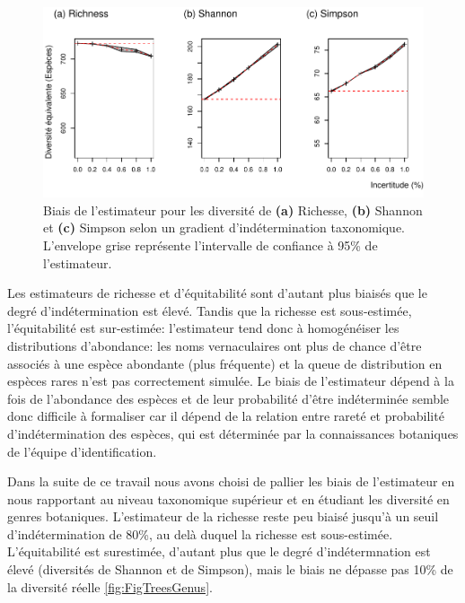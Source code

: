 \documentclass[
  11pt,
  french,
  A4paper,
  extrafontsizes,onecolumn,openright
  ]{memoir}
\begin{document}
\begin{figure}

{\centering \includegraphics[width=1\linewidth]{Manuscript_files/figure-latex/FigTreesSp-1} 

}

\caption{Biais de l'estimateur pour les diversité de \textbf{(a)} Richesse, \textbf{(b)} Shannon et \textbf{(c)} Simpson selon un gradient d'indétermination taxonomique. L'envelope grise représente l'intervalle de confiance à 95\% de l'estimateur.}\label{fig:FigTreesSp}
\end{figure}

Les estimateurs de richesse et d'équitabilité sont d'autant plus biaisés
que le degré d'indétermination est élevé. Tandis que la richesse est
sous-estimée, l'équitabilité est sur-estimée: l'estimateur tend donc à
homogénéiser les distributions d'abondance: les noms vernaculaires ont
plus de chance d'être associés à une espèce abondante (plus fréquente)
et la queue de distribution en espèces rares n'est pas correctement
simulée. Le biais de l'estimateur dépend à la fois de l'abondance des
espèces et de leur probabilité d'être indéterminée semble donc difficile
à formaliser car il dépend de la relation entre rareté et probabilité
d'indétermination des espèces, qui est déterminée par la connaissances
botaniques de l'équipe d'identification.

Dans la suite de ce travail nous avons choisi de pallier les biais de
l'estimateur en nous rapportant au niveau taxonomique supérieur et en
étudiant les diversité en genres botaniques. L'estimateur de la richesse
reste peu biaisé jusqu'à un seuil d'indétermination de 80\%, au delà
duquel la richesse est sous-estimée. L'équitabilité est surestimée,
d'autant plus que le degré d'indétermnation est élevé (diversités de
Shannon et de Simpson), mais le biais ne dépasse pas 10\% de la
diversité réelle \ref{fig:FigTreesGenus}.
\end{document}

